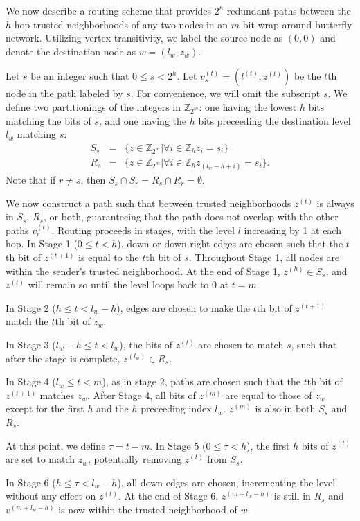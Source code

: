 \documentclass[prodmode,permissions]{acmsmall-ec16}
\newcommand{\beq}{\begin{eqnarray}}
\newcommand{\eeq}{\end{eqnarray}}
\begin{document}
We now describe a routing scheme that provides $2^h$ redundant paths between
the $h$-hop trusted neighborhoods of any two nodes in an $m$-bit
wrap-around butterfly network.
Utilizing vertex transitivity, we label the source node as $(0, 0)$ and
denote the destination node as $w = (l_w, z_w)$.

Let $s$ be an integer such that $0 \leq s < 2^h$.
Let $v_s^{(t)} = (l^{(t)}, z^{(t)})$ be the $t$th node in the path labeled by $s$.
For convenience, we will omit the subscript $s$.
We define two partitionings of the integers in $\mathbb{Z}_{2^m}$:
one having the lowest $h$ bits matching the
bits of $s$, and one having the $h$ bits preceeding the destination level $l_w$
matching $s$:
\beq
S_s &=& \{z \in \mathbb{Z}_{2^m} | \forall i \in \mathbb{Z}_h z_i = s_i \} \\
R_s &=& \{z \in \mathbb{Z}_{2^m} | \forall i \in \mathbb{Z}_h z_{(l_w - h + i)} = s_i \}.
\eeq
Note that if $r \neq s$, then $S_s \cap S_r = R_s \cap R_r = \emptyset$.

We now construct a path such that between trusted neighborhoods $z^{(t)}$ is always
in $S_s$, $R_s$, or both, guaranteeing that the path does not overlap with the
other paths $v_r^{(t)}$.
Routing proceeds in stages, with the level $l$ increasing by 1 at each hop.
In Stage 1 ($0 \leq t < h$), down or down-right edges
are chosen such that the $t$th bit of $z^{(t+1)}$ is equal to the $t$th bit
of $s$. Throughout Stage 1, all nodes are within the sender's trusted neighborhood.
At the end of Stage 1, $z^{(h)} \in S_s$, and $z^{(t)}$ will remain so until the level loops
back to $0$ at $t = m$.

In Stage 2 ($h \leq t < l_w - h$), edges are chosen to make the $t$th bit of
$z^{(t+1)}$ match the $t$th bit of $z_w$.

In Stage 3 ($l_w - h \leq t < l_w$), the bits of $z^{(t)}$ are chosen to match $s$,
such that after the stage is complete, $z^{(l_w)} \in R_s$.

In Stage 4 ($l_w \leq t < m$), as in stage 2,
paths are chosen such that the $t$th bit of $z^{(t+1)}$ matches $z_w$.
After Stage 4, all bits of $z^{(m)}$ are equal to those of $z_w$
except for the first $h$ and the $h$ preceeding index $l_w$.
$z^{(m)}$ is also in both $S_s$ and $R_s$.

At this point, we define $\tau = t - m$.
In Stage 5 ($0 \leq \tau < h$), the first $h$ bits of $z^{(t)}$ are set to
match $z_w$, potentially removing $z^{(t)}$ from $S_s$.

In Stage 6 ($h \leq \tau < l_w - h$), all down edges are chosen, incrementing
the level without any effect on $z^{(t)}$.
At the end of Stage 6, $z^{(m + l_w - h)}$ is still in $R_s$ and
$v^{(m + l_w - h)}$ is now within the trusted neighborhood of $w$.
\end{document}
